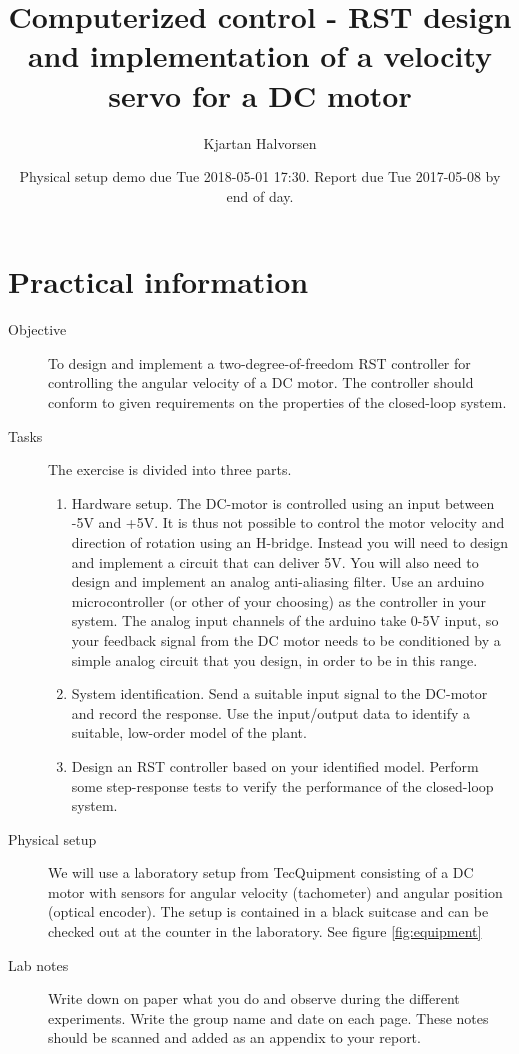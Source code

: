 \documentclass[a4paper]{scrartcl}
\author{Kjartan Halvorsen}
\date{Physical setup demo due Tue 2018-05-01 17:30. Report due Tue 2017-05-08 by end of day.}
\title{Computerized control - RST design and implementation of a velocity servo for a DC motor}
\begin{document}
\maketitle

\section*{Practical information}
\label{sec-1}
\begin{description}
\item[{Objective}] To design and implement a two-degree-of-freedom RST controller for controlling the angular velocity of a DC motor. The controller should conform to given requirements on the properties of the closed-loop system.
\item[{Tasks}] The exercise is divided into three parts.
\begin{enumerate}
\item Hardware setup. The DC-motor is controlled using an input between -5V and +5V. It is thus not possible to control the motor velocity and direction of rotation using an H-bridge. Instead you will need to design and implement a circuit that can deliver \textpm{} 5V. You will also need to design and implement an analog anti-aliasing filter. Use an arduino microcontroller (or other of your choosing) as the controller in your system. The analog input channels of the arduino take 0-5V input, so your feedback signal from the DC motor needs to be conditioned by a simple analog circuit that you design, in order to be in this range.
\item System identification. Send a suitable input signal to the DC-motor and record the response. Use the input/output data to identify a suitable, low-order model of the plant.
\item Design an RST controller based on your identified model. Perform some step-response tests to verify the performance of the closed-loop system.
\end{enumerate}
\item[{Physical setup}] We will use a laboratory setup from TecQuipment consisting of a DC motor with sensors for angular velocity (tachometer) and angular position (optical encoder). The setup is contained in a black suitcase and can be checked out at the counter in the laboratory. See figure \ref{fig:equipment}
\item[{Lab notes}] Write down on paper what you do and observe during the different experiments. Write the group name and date on each page. These notes should be scanned and added as an appendix to your report.
\end{description}
\end{document}
